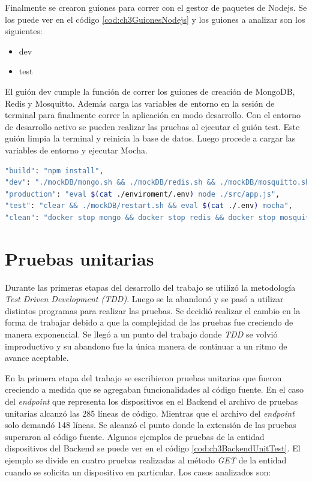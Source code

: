 Finalmente se crearon guiones para correr con el gestor de paquetes de Nodejs.
Se los puede ver en el código \ref{cod:ch3GuionesNodejs} y los guiones a analizar son los siguientes:

\begin{itemize}
	\item dev
	\item test
\end{itemize}

El guión dev cumple la función de correr los guiones de creación de MongoDB, Redis y Mosquitto.
Además carga las variables de entorno en la sesión de terminal para finalmente correr la aplicación en modo desarrollo.
Con el entorno de desarrollo activo se pueden realizar las pruebas al ejecutar el guión test.
Este guión limpia la terminal y reinicia la base de datos. Luego procede a cargar las variables de entorno y ejecutar Mocha.

\begin{lstlisting}[language=bash,label=cod:ch3GuionesNodejs,caption=Guiones de Nodejs.]
"build": "npm install",
"dev": "./mockDB/mongo.sh && ./mockDB/redis.sh && ./mockDB/mosquitto.sh && eval $(cat ./.env) nodemon ./src/app.js",
"production": "eval $(cat ./enviroment/.env) node ./src/app.js",
"test": "clear && ./mockDB/restart.sh && eval $(cat ./.env) mocha",
"clean": "docker stop mongo && docker stop redis && docker stop mosquitto"
\end{lstlisting}

\section{Pruebas unitarias}
Durante las primeras etapas del desarrollo del trabajo se utilizó la metodología \emph{Test Driven Development (TDD)}.
Luego se la abandonó y se pasó a utilizar distintos programas para realizar las pruebas.
Se decidió realizar el cambio en la forma de trabajar debido a que la complejidad de las pruebas fue creciendo de manera exponencial.
Se llegó a un punto del trabajo donde \emph{TDD} se volvió improductivo y su abandono fue la única manera de continuar a un ritmo de avance aceptable.

En la primera etapa del trabajo se escribieron pruebas unitarias que fueron creciendo a medida que se agregaban funcionalidades al código fuente.
En el caso del \emph{endpoint} que representa los dispositivos en el Backend el archivo de pruebas unitarias alcanzó las 285 líneas de código.
Mientras que el archivo del \emph{endpoint} solo demandó 148 líneas.
Se alcanzó el punto donde la extensión de las pruebas superaron al código fuente.
Algunos ejemplos de pruebas de la entidad dispositivos del Backend se puede ver en el código \ref{cod:ch3BackendUnitTest}.
El ejemplo se divide en cuatro pruebas realizadas al método \emph{GET} de la entidad cuando se solicita un dispositivo en particular.
Los casos analizados son:

